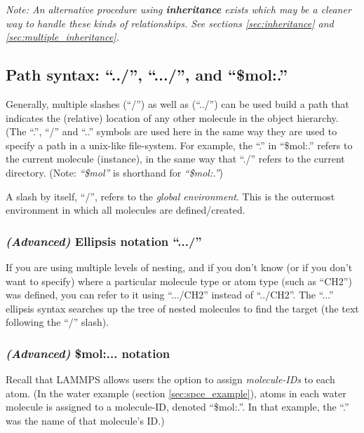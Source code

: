 \documentclass[11pt]{article}
\begin{document}


\textit{Note: An alternative procedure using \textbf{inheritance}
exists which may be a cleaner way to handle these kinds of relationships.
See sections \ref{sec:inheritance} and \ref{sec:multiple_inheritance}.}

\subsection{Path syntax: ``../'', ``.../'', and ``\$mol:.''}
\label{sec:paths}
Generally, multiple slashes (``/'') as well as (``../'') can be
used build a path that indicates the (relative) location 
of any other molecule in the object hierarchy. 
(The ``.'', ``/'' and ``..'' symbols are used here in the same way 
they are used to specify a path in a unix-like file-system.
For example, the ``.'' in ``\$mol:.'' refers to the 
current molecule (instance), in the same way that 
``./'' refers to the current directory.
(Note: \mbox{\textit{``\$mol''}} is shorthand for \mbox{\textit{``\$mol:.''}})

A slash by itself, ``/'', refers to the \textit{global environment}.
This is the outermost environment in which all molecules are defined/created.


\subsubsection{\textit{(Advanced)} Ellipsis notation ``.../''}
\label{sec:ellipsis_type}
If you are using multiple levels of nesting,
and if you don't know (or if you don't want to specify) where
a particular molecule type or atom type (such as ``CH2'') was defined, 
you can refer to it using ``.../CH2'' 
instead of ``../CH2''.
The ``...'' ellipsis syntax searches up the tree of nested 
molecules to find the target (the text following the ``/'' slash).

\subsubsection{\textit{(Advanced)} \$mol:... notation}
\label{sec:ellipsis_mol}
Recall that LAMMPS allows users the option to assign
\textit{molecule-IDs} to each atom.
(In the water example (section \ref{sec:spce_example}), atoms in
each water molecule is assigned to a molecule-ID, denoted ``\$mol:.''.
In that example, the ``.'' was the name of that molecule's ID.)
\end{document}
